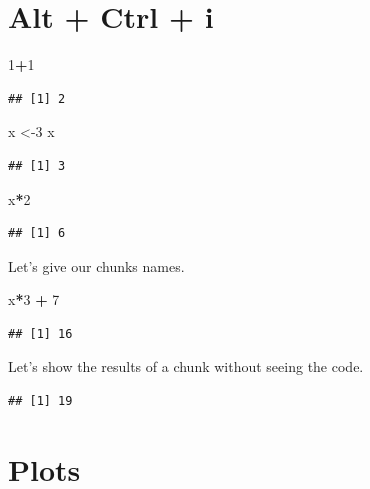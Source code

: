 \documentclass[]{article}
\newenvironment{Shaded}{\begin{snugshade}}{\end{snugshade}}
\newcommand{\DecValTok}[1]{\textcolor[rgb]{0.00,0.00,0.81}{#1}}
\newcommand{\StringTok}[1]{\textcolor[rgb]{0.31,0.60,0.02}{#1}}
\newcommand{\OperatorTok}[1]{\textcolor[rgb]{0.81,0.36,0.00}{\textbf{#1}}}
\newcommand{\NormalTok}[1]{#1}
\begin{document}
\section{Alt + Ctrl + i}\label{alt-ctrl-i}

\begin{Shaded}
\begin{Highlighting}[]
\DecValTok{1}\OperatorTok{+}\DecValTok{1}
\end{Highlighting}
\end{Shaded}

\begin{verbatim}
## [1] 2
\end{verbatim}

\begin{Shaded}
\begin{Highlighting}[]
\NormalTok{x <-}\DecValTok{3}
\NormalTok{x}
\end{Highlighting}
\end{Shaded}

\begin{verbatim}
## [1] 3
\end{verbatim}

\begin{Shaded}
\begin{Highlighting}[]
\NormalTok{x}\OperatorTok{*}\DecValTok{2}
\end{Highlighting}
\end{Shaded}

\begin{verbatim}
## [1] 6
\end{verbatim}

Let's give our chunks names.

\begin{Shaded}
\begin{Highlighting}[]
\NormalTok{x}\OperatorTok{*}\DecValTok{3} \OperatorTok{+}\StringTok{ }\DecValTok{7}
\end{Highlighting}
\end{Shaded}

\begin{verbatim}
## [1] 16
\end{verbatim}

Let's show the results of a chunk without seeing the code.

\begin{verbatim}
## [1] 19
\end{verbatim}

\section{Plots}\label{plots}
\end{document}

